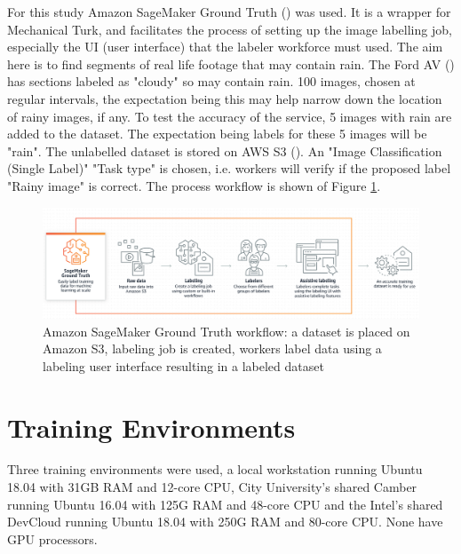 For this study Amazon SageMaker Ground Truth (\cite{SageMakerGroundTruthDocumentation2020}) was used. It is a wrapper for Mechanical Turk, and facilitates the process of setting up the image labelling job, especially the UI (user interface) that the labeler workforce must used.  
The aim here is to find segments of real life footage that may contain rain. The Ford AV (\cite{agarwal2020ford}) has sections labeled as "cloudy" so may contain rain. 100 images, chosen at regular intervals, the expectation being this may help narrow down the location of rainy images, if any. To test the accuracy of the service, 5 images with rain are added to the dataset. The expectation being labels for these 5 images will be "rain". 
The unlabelled dataset is stored on AWS S3 (\cite{AmazonS3Documentation2020}). An "Image Classification (Single Label)" "Task type" is chosen, i.e. workers will verify if the proposed label "Rainy image" is correct. The process workflow is shown of Figure \ref{fig:amazon-ground-truth}.

\begin{figure}[ht]
 \centering 
 \includegraphics[width=\textwidth]{Figures/SageMakerGroundTruth.png}
 \caption{Amazon SageMaker Ground Truth workflow: a dataset is placed on Amazon S3, labeling job is created, workers label data using a labeling user interface resulting in a labeled dataset}
 \label{fig:amazon-ground-truth}
\end{figure}

\section{Training Environments}
Three training environments were used, a local workstation running Ubuntu 18.04 with 31GB RAM and 12-core CPU, City University's shared Camber running Ubuntu 16.04 with 125G RAM and 48-core CPU and the Intel's shared DevCloud running Ubuntu 18.04 with 250G RAM and 80-core CPU. None have GPU processors.

